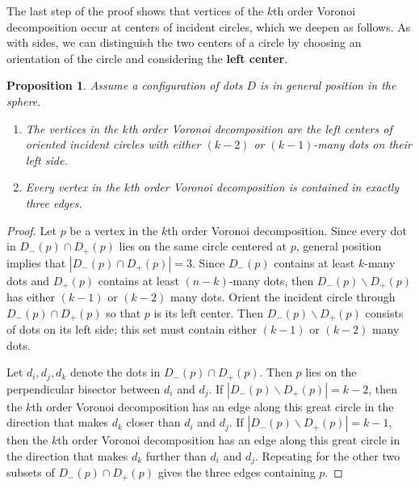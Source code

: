 \documentclass[11pt,oneside]{amsart}
\newtheorem{prop}[thm]{Proposition}
\theoremstyle{definition}
\theoremstyle{remark}
\numberwithin{equation}{section}
\begin{document}
The last step of the proof shows that vertices of the $k$th order Voronoi decomposition occur at centers of incident circles, which we deepen as follows.
As with sides, we can distinguish the two centers of a circle by choosing an orientation of the circle and considering the \textbf{left center}. 


\begin{prop}\label{prop: blackwhite3}
Assume a configuration of dots $D$ is in general position in the sphere.
\begin{enumerate}
    \item The vertices in the $k$th order Voronoi decomposition are the left centers of oriented incident circles with either $(k-2)$ or $(k-1)$-many dots on their left side.
    \item Every vertex in the $k$th order Voronoi decomposition is contained in exactly three edges.
\end{enumerate}

\end{prop}

\begin{proof}
Let $p$ be a vertex in the $k$th order Voronoi decomposition.
Since every dot in $D_-(p)\cap D_+(p)$ lies on the same circle centered at $p$,
general position implies that $|D_-(p)\cap D_+(p)|=3$. Since $D_-(p)$ contains at least $k$-many dots and $D_+(p)$ contains at least $(n-k)$-many dots, then 
$D_-(p) \smallsetminus D_+(p)$ has either $(k-1)$ or $(k-2)$ many dots.
Orient the incident circle through $D_-(p)\cap D_+(p)$ so that $p$ is its left center. Then $D_-(p)\smallsetminus D_+(p)$ consists of dots on its left side; this set must contain either $(k-1)$ or $(k-2)$ many dots.

Let $d_i,d_j,d_k$ denote the dots in $D_-(p)\cap D_+(p)$. Then $p$ lies on the perpendicular bisector between $d_i$ and $d_j$. %
If $|D_-(p)\smallsetminus D_+(p)| = k-2$, then the $k$th order Voronoi decomposition has an edge along this great circle in the direction that makes $d_k$ closer than $d_i$ and $d_j$. If $|D_-(p)\smallsetminus D_+(p)| = k-1$, then the $k$th order Voronoi decomposition has an edge along this great circle in the direction that makes $d_k$ further than $d_i$ and $d_j$. Repeating for the other two subsets of $D_-(p)\cap D_+(p)$ gives the three edges containing $p$.
\end{proof}
\end{document}
